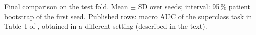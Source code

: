 \begin{table}[htbp]
\centering
\caption[Final comparison (test)]{Final comparison on the test fold. Mean $\pm$ SD over seeds; interval: 95\,\% patient bootstrap of the first seed. Published rows: macro AUC of the superclass task in Table~I of \cite{strodthoff2021deep}, obtained in a different setting (described in the text).}
\label{tab:comparison_final}
\small
\begin{adjustbox}{max width=\textwidth}

\end{adjustbox}
\end{table}
